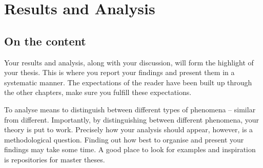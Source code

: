 \chapter{Results and Analysis}
\label{chp:results}
\section{On the content}
Your results and analysis, along with your discussion, will form the highlight of your thesis. This is where you report your findings and present them in a systematic manner. The expectations of the reader have been built up through the other chapters, make sure you fulfill these expectations.

To analyse means to distinguish between different types of phenomena -- similar from different. Importantly, by distinguishing between different phenomena, your theory is put to work. Precisely how your analysis should appear, however, is a methodological question. Finding out how best to organise and present your findings may take some time. A good place to look for examples and inspiration is repositories for master theses.